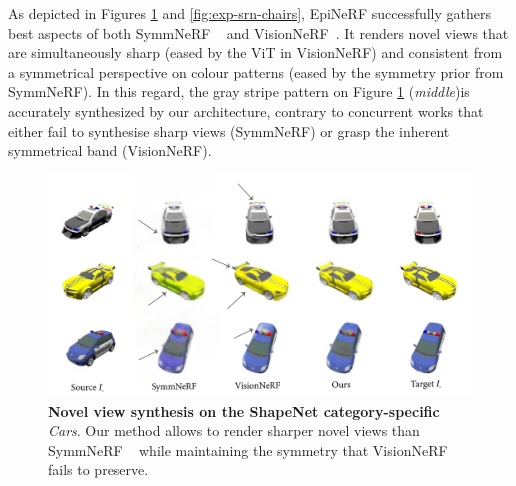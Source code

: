 As depicted in Figures \ref{fig:exp-srn-cars} and \ref{fig:exp-srn-chairs}, EpiNeRF successfully gathers best aspects of both SymmNeRF ~\citep{li2022symmnerf} and VisionNeRF~\citep{lin2023vision}. It renders novel views that are simultaneously sharp (eased by the ViT in VisionNeRF) and consistent from a symmetrical perspective on colour patterns (eased by the symmetry prior from SymmNeRF). In this regard, the gray stripe pattern on Figure \ref{fig:exp-srn-cars} (\textit{middle})is  accurately synthesized by our architecture, contrary to concurrent works that either fail to synthesise sharp views (SymmNeRF) or grasp the inherent symmetrical band (VisionNeRF). 

\begin{figure}[h!]
    \begin{center}
  \includegraphics[width=\linewidth]{images/epinerf/cars_BMVC.png}
  \end{center}
  \caption{\textbf{Novel view synthesis on the ShapeNet category-specific} \textit{Cars}. Our method allows to render sharper novel views than SymmNeRF ~\citep{li2022symmnerf} while maintaining the symmetry that VisionNeRF ~\citep{lin2023vision} fails to preserve.}
  \label{fig:exp-srn-cars}
\end{figure}

